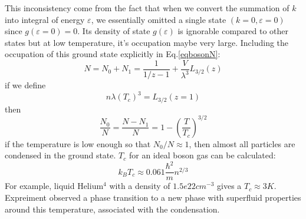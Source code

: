 \documentclass{article}
\begin{document}
This inconsistency come from the fact that when we convert the summation of $k$ into integral of energy $\varepsilon$, we essentially omitted 
a single state $(k=0,\varepsilon=0)$ since $g(\varepsilon=0)=0$. Its density of state $g(\varepsilon)$ is ignorable compared to other states but
at low temperature, it's occupation maybe very large. Including the occupation of this ground state explicitly in Eq.\ref{eqbosonN}:
\begin{equation}
    N = N_0 + N_1 = \frac{1}{1/z-1} + \frac{V}{\lambda^3} L_{3/2}(z)
\end{equation}
if we define 
\begin{equation}
    n \lambda(T_c)^3 = L_{3/2}(z=1)
\end{equation}
then
\begin{equation}
    \frac{N_0}{N} = \frac{N-N_1}{N} = 1-\left(\frac{T}{T_c}\right)^{3/2}
\end{equation}
if the temperature is low enough so that $N_0/N \approx 1$, then almost all particles are condensed in the ground state. $T_c$ for an ideal boson gas can be calculated:
\begin{equation}
    k_B T_c \approx 0.061 \frac{\hbar^2}{m} n^{2/3}
\end{equation}
For example, liquid Helium$^4$ with a density of $1.5e22 cm^{-3}$ gives a $T_c \approx 3K$. Expreiment observed a phase transition to a 
new phase with superfluid properties around this temperature, associated with the condensation.
\end{document}
